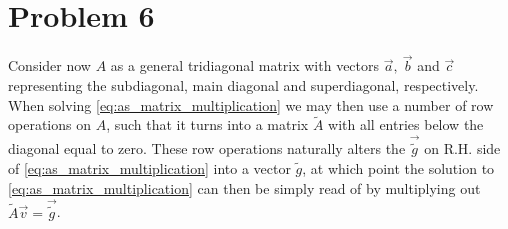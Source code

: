 \documentclass[english,notitlepage,reprint,nofootinbib]{revtex4-2}  %
\begin{document}
\section{Problem 6} \label{sec:problem6}
Consider now $A$ as a general tridiagonal matrix with vectors $\vec{a}, \ \vec{b}$ and \(\vec{c}\) representing the subdiagonal, main diagonal and superdiagonal, respectively. When solving \eqref{eq:as_matrix_multiplication} we may then use a number of row operations on $A$, such that it turns into a matrix $\tilde{A}$ with all entries below the diagonal equal to zero. These row operations naturally alters the $\vec{\tilde{g}}$ on R.H. side of \eqref{eq:as_matrix_multiplication} into a vector $\tilde{g}$, at which point the solution to \eqref{eq:as_matrix_multiplication} can then be simply read of by multiplying out $\tilde{A}\vec{v} = \vec{\tilde{g}}$.
\end{document}
